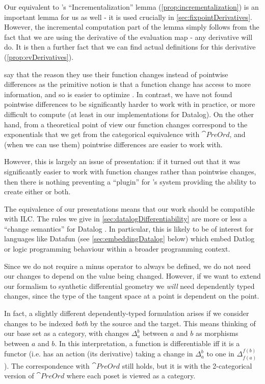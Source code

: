 Our equivalent to \citeauthor{cai2014changes}'s ``Incrementalization'' lemma
(\cref{prop:incrementalization}) is an important lemma for us as well - it is used
crucially in \cref{sec:fixpointDerivatives}. However, the incremental computation part of
the lemma simply follows from the fact that we are using the derivative of the
evaluation map - any derivative will do. It is then a further fact that we can
find actual definitions for this derivative (\cref{prop:evDerivatives}).

\citeauthor{cai2014changes} say that the reason they use their function changes instead of pointwise
differences as the primitive notion is that a function change has access to more
information, and so is easier to optimize \autocite[][section
2.2]{cai2014changes}. In contrast, we have not found pointwise differences to be
significantly harder to work with in practice, or more difficult to compute (at least in our implementations
for Datalog). On the other hand, from a theoretical point of view our function changes correspond to the
exponentials that we get from the categorical equivalence with $\cat{PreOrd}$,
and (when we can use them) pointwise differences are easier to work with.

However, this is largely an issue of presentation: if it turned out that it was
significantly easier to work with function changes rather than pointwise
changes, then there is nothing preventing a ``plugin'' for \citeauthor{cai2014changes}'s system providing the
ability to create either or both.

The equivalence of our presentations means that our work should be compatible
with ILC. The rules we give in \cref{sec:datalogDifferentiability} are more or
less a ``change semantics'' for Datalog \autocite[See][section
3.5]{cai2014changes}. In particular, this is likely to be of interest for languages like
Datafun (see \cref{sec:embeddingDatalog} below) which embed Datlog or logic programming behaviour within a broader
programming context.

Since we do not require a minus operator to always be defined, we do not need
our changes to depend on the value being changed. However,
if we want to extend our formalism to synthetic differential geometry we \emph{will} need
dependently typed changes, since the type of the tangent space at a point is
dependent on the point.

In fact, a slightly different dependently-typed formulation arises if we consider changes
to be indexed \emph{both} by the source and the target. This means
thinking of our base set as a category, with changes $\Delta_a^b$ between $a$
and $b$ as morphisms between $a$ and $b$. In this interpretation, a function is
differentiable iff it is a functor (i.e. has an action (its derivative) taking a
change in $\Delta_a^b$ to one in $\Delta_{f(a)}^{f(b)}$). The correspondence
with $\cat{PreOrd}$ still holds, but it is with the 2-categorical version of
$\cat{PreOrd}$ where each poset is viewed as a category.

